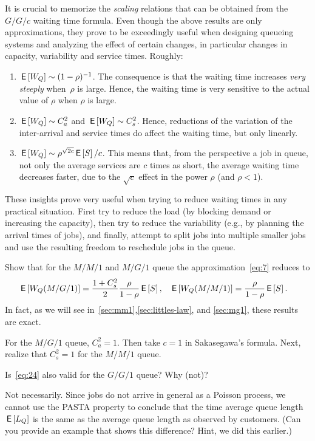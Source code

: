 It is crucial to memorize the \emph{scaling} relations that can be obtained from the $G/G/c$ waiting time formula.
Even though the above results are only approximations, they prove to be exceedingly useful when designing queueing systems and analyzing the effect of certain changes, in particular changes in capacity, variability and service times.
Roughly:
\begin{enumerate}
\item $\,\mathsf{E}\left[W_Q\right] \sim (1-\rho)^{-1}$. The consequence is that the waiting
 time increases \emph{very steeply} when~$\rho$ is large. Hence, the waiting time is
 very sensitive to the actual value of $\rho$ when $\rho$ is large.
\item $\,\mathsf{E}\left[W_Q\right] \sim C_a^2$ and $\,\mathsf{E}\left[W_Q\right] \sim C_s^2$.
 Hence, reductions of the variation of the inter-arrival and service times do affect the waiting time, but only linearly.
\item $\,\mathsf{E}\left[W_Q\right] \sim \rho^{\sqrt{2c}} \,\mathsf{E}\left[S\right]/c$. This means that, from the perspective a job in queue, not only the average services are $c$ times as short, the average waiting time decreases faster, due to the $\sqrt{c}$ effect in the power $\rho$ (and $\rho<1$). 
\end{enumerate}

These insights prove very useful when trying to reduce waiting times in any practical situation.
First try to reduce the load (by blocking demand or increasing the capacity), then try to reduce the variability (e.g., by planning the arrival times of jobs), and finally, attempt to split jobs into multiple smaller jobs and use the resulting freedom to reschedule jobs in the queue.




\begin{exercise}
 Show that for the  $M/M/1$ and $M/G/1$ queue  the approximation~\cref{eq:7} reduces to
\begin{align*}
  \,\mathsf{E}\left[W_Q(M/G/1)\right] &= \frac{1+C_s^2}2\frac{\rho}{1-\rho} \,\mathsf{E}\left[S\right], & 
  \,\mathsf{E}\left[W_Q(M/M/1)\right] &= \frac{\rho}{1-\rho} \,\mathsf{E}\left[S\right].
\end{align*}
In fact, as we will see in~\cref{sec:mm1},\cref{sec:littles-law}, and \cref{sec:mg1}, these results are exact. 
\begin{solution}
For the $M/G/1$ queue, $C_a^2=1$. Then take $c=1$ in Sakasegawa's formula. Next, realize that $C_s^2=1$ for the $M/M/1$ queue. 
\end{solution}
\end{exercise}


\begin{extra}
 Is~\cref{eq:24} also valid for the $G/G/1$ queue? Why (not)?
\begin{solution}
 Not necessarily.
 Since jobs do not arrive in general as a Poisson process, we cannot use the PASTA property to conclude that the time average queue length $\,\mathsf{E}\left[L_Q\right]$ is the same as the average queue length as observed by customers.
 (Can you provide an example that shows this difference?
 Hint, we did this earlier.)
\end{solution}
\end{extra}


